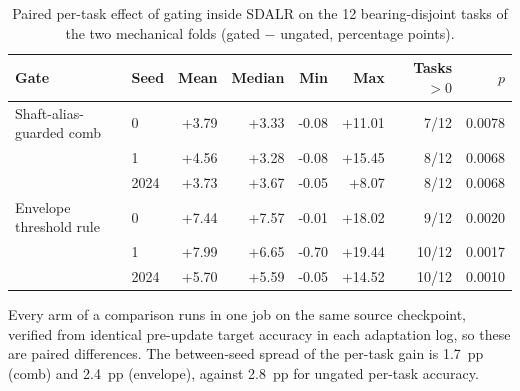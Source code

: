 \begin{table}[htbp]
\centering
\caption{Paired per-task effect of gating inside SDALR on the 12 bearing-disjoint tasks of the two mechanical folds (gated $-$ ungated, percentage points).}
\label{tab:gains}
\small
\setlength{\tabcolsep}{4pt}
\begin{tabular}{llrrrrrr}
\toprule
Gate & Seed & Mean & Median & Min & Max & Tasks $>0$ & $p$ \\
\midrule
Shaft-alias-guarded comb & 0 & +3.79 & +3.33 & -0.08 & +11.01 & 7/12 & 0.0078 \\
 & 1 & +4.56 & +3.28 & -0.08 & +15.45 & 8/12 & 0.0068 \\
 & 2024 & +3.73 & +3.67 & -0.05 & +8.07 & 8/12 & 0.0068 \\
\midrule
Envelope threshold rule & 0 & +7.44 & +7.57 & -0.01 & +18.02 & 9/12 & 0.0020 \\
 & 1 & +7.99 & +6.65 & -0.70 & +19.44 & 10/12 & 0.0017 \\
 & 2024 & +5.70 & +5.59 & -0.05 & +14.52 & 10/12 & 0.0010 \\
\bottomrule
\end{tabular}
\begin{minipage}{\linewidth}\vspace{2pt}\footnotesize Every arm of a comparison runs in one job on the same source checkpoint, verified from identical pre-update target accuracy in each adaptation log, so these are paired differences. The between-seed spread of the per-task gain is 1.7~pp (comb) and 2.4~pp (envelope), against 2.8~pp for ungated per-task accuracy.\end{minipage}
\end{table}

